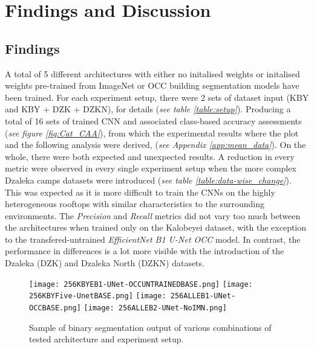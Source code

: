 \documentclass[11pt, a4paper, twoside]{report}
\begin{document}
\newpage

\chapter{Findings and Discussion}\label{find&discuss}

\section{Findings}\label{Findings}

A total of 5 different architectures with either no initalised weights or initalised weights pre-trained from ImageNet or OCC building segmentation models have been trained. For each experiment setup, there were 2 sets of dataset input (KBY and KBY + DZK + DZKN), for details (\textit{see table \ref{table:setup}}). Producing a total of 16 sets of trained CNN and associated class-based accuracy assessments (\textit{see figure \ref{fig:Cat_CAA}}), from which the experimental results where the plot and the following analysis were derived, (\textit{see Appendix \ref{app:mean_data}}). On the whole, there were both expected and unexpected results. A reduction in every metric were observed in every single experiment setup when the more complex Dzaleka camps datasets were introduced (\textit{see table \ref{table:data-wise_change}}). This was expected as it is more difficult to train the CNNs on the highly heterogeneous rooftops with similar characteristics to the surrounding environments. The \textit{Precision} and \textit{Recall} metrics did not vary too much between the architectures when trained only on the Kalobeyei dataset, with the exception to the transfered-untrained \textit{EfficientNet B1 U-Net OCC} model. In contrast, the performance in differences is a lot more visible with the introduction of the Dzaleka (DZK) and Dzaleka North (DZKN) datasets.\\\par

\begin{figure}[H]
  \centering
  \texttt{[image: 256KBYEB1-UNet-OCCUNTRAINEDBASE.png]}
  \texttt{[image: 256KBYFive-UnetBASE.png]}
  \texttt{[image: 256ALLEB1-UNet-OCCBASE.png]}
  \texttt{[image: 256ALLEB2-UNet-NoIMN.png]}
  \caption{Sample of binary segmentation output of various combinations of tested architecture and experiment setup.}
  \label{fig:output}
\end{figure}

\newpage
\end{document}

